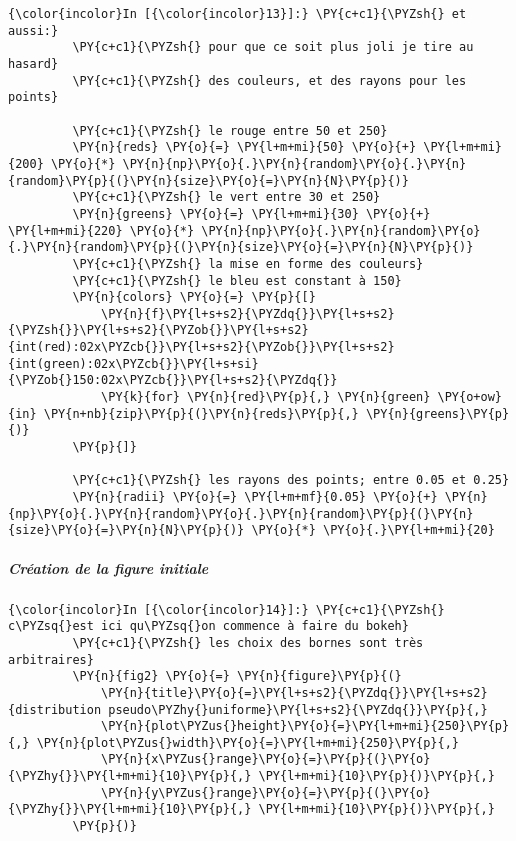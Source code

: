     \begin{Verbatim}[commandchars=\\\{\}]
{\color{incolor}In [{\color{incolor}13}]:} \PY{c+c1}{\PYZsh{} et aussi:}
         \PY{c+c1}{\PYZsh{} pour que ce soit plus joli je tire au hasard}
         \PY{c+c1}{\PYZsh{} des couleurs, et des rayons pour les points}
         
         \PY{c+c1}{\PYZsh{} le rouge entre 50 et 250}
         \PY{n}{reds} \PY{o}{=} \PY{l+m+mi}{50} \PY{o}{+} \PY{l+m+mi}{200} \PY{o}{*} \PY{n}{np}\PY{o}{.}\PY{n}{random}\PY{o}{.}\PY{n}{random}\PY{p}{(}\PY{n}{size}\PY{o}{=}\PY{n}{N}\PY{p}{)}
         \PY{c+c1}{\PYZsh{} le vert entre 30 et 250}
         \PY{n}{greens} \PY{o}{=} \PY{l+m+mi}{30} \PY{o}{+} \PY{l+m+mi}{220} \PY{o}{*} \PY{n}{np}\PY{o}{.}\PY{n}{random}\PY{o}{.}\PY{n}{random}\PY{p}{(}\PY{n}{size}\PY{o}{=}\PY{n}{N}\PY{p}{)}
         \PY{c+c1}{\PYZsh{} la mise en forme des couleurs}
         \PY{c+c1}{\PYZsh{} le bleu est constant à 150}
         \PY{n}{colors} \PY{o}{=} \PY{p}{[}
             \PY{n}{f}\PY{l+s+s2}{\PYZdq{}}\PY{l+s+s2}{\PYZsh{}}\PY{l+s+s2}{\PYZob{}}\PY{l+s+s2}{int(red):02x\PYZcb{}}\PY{l+s+s2}{\PYZob{}}\PY{l+s+s2}{int(green):02x\PYZcb{}}\PY{l+s+si}{\PYZob{}150:02x\PYZcb{}}\PY{l+s+s2}{\PYZdq{}}
             \PY{k}{for} \PY{n}{red}\PY{p}{,} \PY{n}{green} \PY{o+ow}{in} \PY{n+nb}{zip}\PY{p}{(}\PY{n}{reds}\PY{p}{,} \PY{n}{greens}\PY{p}{)}
         \PY{p}{]}
         
         \PY{c+c1}{\PYZsh{} les rayons des points; entre 0.05 et 0.25}
         \PY{n}{radii} \PY{o}{=} \PY{l+m+mf}{0.05} \PY{o}{+} \PY{n}{np}\PY{o}{.}\PY{n}{random}\PY{o}{.}\PY{n}{random}\PY{p}{(}\PY{n}{size}\PY{o}{=}\PY{n}{N}\PY{p}{)} \PY{o}{*} \PY{o}{.}\PY{l+m+mi}{20}
\end{Verbatim}


    \hypertarget{cruxe9ation-de-la-figure-initiale}{%
\subparagraph{Création de la figure
initiale}\label{cruxe9ation-de-la-figure-initiale}}

    \begin{Verbatim}[commandchars=\\\{\}]
{\color{incolor}In [{\color{incolor}14}]:} \PY{c+c1}{\PYZsh{} c\PYZsq{}est ici qu\PYZsq{}on commence à faire du bokeh}
         \PY{c+c1}{\PYZsh{} les choix des bornes sont très arbitraires}
         \PY{n}{fig2} \PY{o}{=} \PY{n}{figure}\PY{p}{(}
             \PY{n}{title}\PY{o}{=}\PY{l+s+s2}{\PYZdq{}}\PY{l+s+s2}{distribution pseudo\PYZhy{}uniforme}\PY{l+s+s2}{\PYZdq{}}\PY{p}{,}
             \PY{n}{plot\PYZus{}height}\PY{o}{=}\PY{l+m+mi}{250}\PY{p}{,} \PY{n}{plot\PYZus{}width}\PY{o}{=}\PY{l+m+mi}{250}\PY{p}{,}
             \PY{n}{x\PYZus{}range}\PY{o}{=}\PY{p}{(}\PY{o}{\PYZhy{}}\PY{l+m+mi}{10}\PY{p}{,} \PY{l+m+mi}{10}\PY{p}{)}\PY{p}{,}
             \PY{n}{y\PYZus{}range}\PY{o}{=}\PY{p}{(}\PY{o}{\PYZhy{}}\PY{l+m+mi}{10}\PY{p}{,} \PY{l+m+mi}{10}\PY{p}{)}\PY{p}{,}
         \PY{p}{)}
\end{Verbatim}


